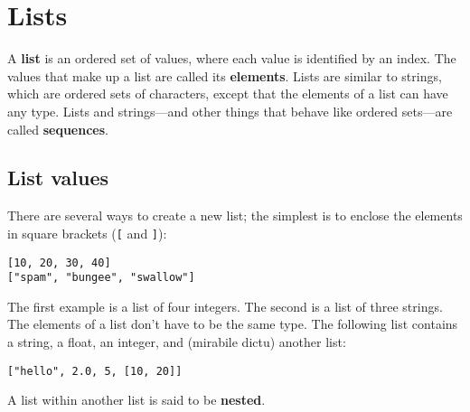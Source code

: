


\chapter{Lists}

A {\bf list} is an ordered set of values, where each value is
identified by an index.  The values that make up a list are
called its {\bf elements}.  Lists are similar to strings, which are
ordered sets of characters, except that the elements of a list can
have any type.  Lists and strings---and other things that behave like
ordered sets---are called {\bf sequences}.


\section{List values}

There are several ways to create a new list; the simplest is to
enclose the elements in square brackets (\verb+[+ and \verb+]+):

\beforeverb
\begin{verbatim}
[10, 20, 30, 40]
["spam", "bungee", "swallow"]
\end{verbatim}
\afterverb
%
The first example is a list of four integers.  The second is a list of
three strings.  The elements of a list don't have to be the same type.
The following list contains a string, a float, an integer, and
(mirabile dictu) another list:

\beforeverb
\begin{verbatim}
["hello", 2.0, 5, [10, 20]]
\end{verbatim}
\afterverb
%
A list within another list is said to be {\bf nested}.

